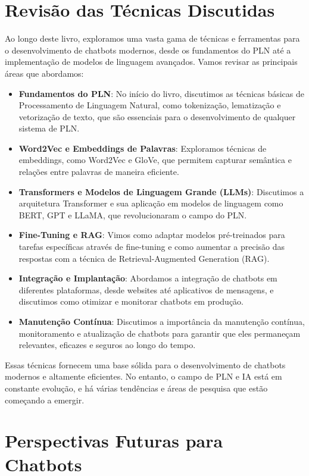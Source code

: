 \documentclass[14pt,a4paper,oneside]{book}
\begin{document}
\section{Revisão das Técnicas Discutidas}

Ao longo deste livro, exploramos uma vasta gama de técnicas e ferramentas para o desenvolvimento de chatbots modernos, desde os fundamentos do PLN até a implementação de modelos de linguagem avançados. Vamos revisar as principais áreas que abordamos:

\begin{itemize}
	\item \textbf{Fundamentos do PLN}: No início do livro, discutimos as técnicas básicas de Processamento de Linguagem Natural, como tokenização, lematização e vetorização de texto, que são essenciais para o desenvolvimento de qualquer sistema de PLN.
	\item \textbf{Word2Vec e Embeddings de Palavras}: Exploramos técnicas de embeddings, como Word2Vec e GloVe, que permitem capturar semântica e relações entre palavras de maneira eficiente.
	\item \textbf{Transformers e Modelos de Linguagem Grande (LLMs)}: Discutimos a arquitetura Transformer e sua aplicação em modelos de linguagem como BERT, GPT e LLaMA, que revolucionaram o campo do PLN.
	\item \textbf{Fine-Tuning e RAG}: Vimos como adaptar modelos pré-treinados para tarefas específicas através de fine-tuning e como aumentar a precisão das respostas com a técnica de Retrieval-Augmented Generation (RAG).
	\item \textbf{Integração e Implantação}: Abordamos a integração de chatbots em diferentes plataformas, desde websites até aplicativos de mensagens, e discutimos como otimizar e monitorar chatbots em produção.
	\item \textbf{Manutenção Contínua}: Discutimos a importância da manutenção contínua, monitoramento e atualização de chatbots para garantir que eles permaneçam relevantes, eficazes e seguros ao longo do tempo.
\end{itemize}

Essas técnicas fornecem uma base sólida para o desenvolvimento de chatbots modernos e altamente eficientes. No entanto, o campo de PLN e IA está em constante evolução, e há várias tendências e áreas de pesquisa que estão começando a emergir.

\section{Perspectivas Futuras para Chatbots}
\end{document}

